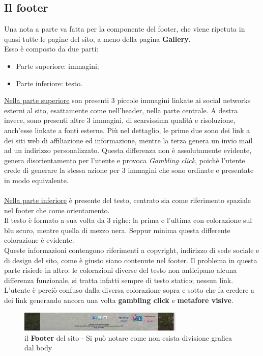 \documentclass[../Relazione.tex]{subfiles}
\begin{document}
	\subsection{Il footer}
		Una nota a parte va fatta per la componente del footer, che viene ripetuta in quasi tutte le pagine del sito, a meno della pagina \textbf{Gallery}.\\
		Esso è composto da due parti:
		\begin{itemize}
			\item Parte superiore: immagini;
			\item Parte inferiore: testo.
		\end{itemize}
		\underline{Nella parte superiore} son presenti 3 piccole immagini linkate ai social networks esterni al sito, esattamente come nell'header, nella parte centrale. A destra invece, sono presenti altre 3 immagini, di scarsissima qualità e risoluzione, anch'esse linkate a fonti esterne.
		Più nel dettaglio, le prime due sono dei link a dei siti web di affiliazione ed informazione, mentre la terza genera un invio mail ad un indirizzo personalizzato.
		Questa differenza non è assolutamente evidente, genera disorientamento per l'utente e provoca \emph{Gambling click}, poichè l'utente crede di generare la stessa azione per 3 immagini che sono ordinate e presentate in modo equivalente. \\\\
		\underline{Nella parte inferiore} è presente del testo, centrato sia come riferimento spaziale nel footer che come orientamento.\\
		Il testo è formato a sua volta da 3 righe: la prima e l'ultima con colorazione sul blu scuro, mentre quella di mezzo nera. Seppur minima questa differente colorazione è evidente.\\
		Queste informazioni contengono riferimenti a copyright, indirizzo di sede sociale e di design del sito, come è giusto siano contenute nel footer.
		Il problema in questa parte risiede in altro: le colorazioni diverse del testo non anticipano alcuna differenza funzionale, si tratta infatti sempre di testo statico; nessun link.
		L'utente è perciò confuso dalla diversa colorazione sopra e sotto che fa credere a dei link generando ancora una volta \textbf{gambling click} e \textbf{metafore visive}.

		\begin{figure}[!h]
			\centering
			\includegraphics[width=0.7\textwidth]{img/contenuto/Footer.png}
			\caption{il \textbf{Footer} del sito - Si può notare come non esista divisione grafica dal body}
			\label{fig:label}
		\end{figure}
		
\end{document}
